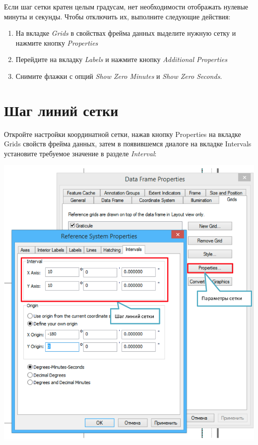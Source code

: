 \documentclass[12pt,]{book}
\begin{document}
Если шаг сетки кратен целым градусам, нет необходимости отображать нулевые минуты и секунды. Чтобы отключить их, выполните следующие действия:

\begin{enumerate}
\def\labelenumi{\arabic{enumi}.}
\item
  На вкладке \emph{Grids} в свойствах фрейма данных выделите нужную сетку и нажмите кнопку \emph{Properties}
\item
  Перейдите на вкладку \emph{Labels} и нажмите кнопку \emph{Additional Properties}
\item
  Снимите флажки с опций \emph{Show Zero Minutes} и \emph{Show Zero Seconds}.
\end{enumerate}

\hypertarget{section-40}{%
\section{Шаг линий сетки}\label{section-40}}

Откройте настройки координатной сетки, нажав кнопку Properties на вкладке Grids свойств фрейма данных, затем в появившемся диалоге на вкладке Intervals установите требуемое значение в разделе \emph{Interval}:

\includegraphics{images/Appendix/image66.png}
\end{document}
